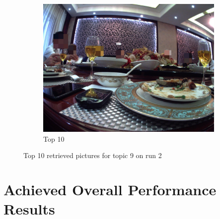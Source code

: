 \begin{figure}[H]
\begin{subfigure}{0.32\textwidth}
        \includegraphics[width=\textwidth]{Sections/7Results/images/run2top10.jpg}\hfill
        \caption{Top 10}
      \end{subfigure}
    \caption{Top 10 retrieved pictures for topic 9 on run 2}
    \label{fig:run2}
  \end{figure}





  \newpage

 
\newpage

\section{Achieved Overall Performance Results}
\label{sec:perfomance_results}

